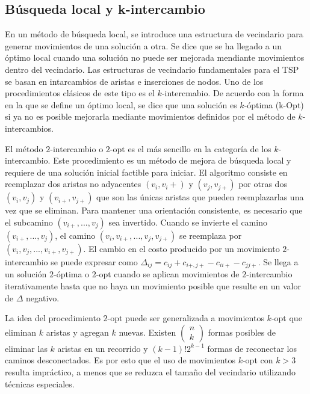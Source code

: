 \subsection*{Búsqueda local y k-intercambio}
En un método de búsqueda local, se introduce una estructura de vecindario para generar movimientos de una solución a otra. Se dice que se ha llegado a un óptimo local cuando una solución no puede ser mejorada mendiante movimientos dentro del vecindario. Las estructuras de vecindario fundamentales para el TSP se basan en intarcambios de aristas e inserciones de nodos. Uno de los procedimientos clásicos de este tipo es el $k$-intercmabio. De acuerdo con la forma en la que se define un óptimo local, se dice que una solución es $k$-óptima (k-Opt) si ya no es posible mejorarla mediante movimientos definidos por el método de $k$-intercambios.
\par El método $2$-intercambio o $2$-opt es el más sencillo en la categoría de los $k$-intercambio. Este procedimiento es un método de mejora de búsqueda local y requiere de una solución inicial factible para iniciar. El algoritmo consiste en reemplazar dos aristas no adyacentes $(v_i, v_i+)$ y $(v_j, v_{j+})$ por otras dos $(v_i, v_j)$ y $(v_{i+}, v_{j+})$  que son las únicas aristas que pueden reemplazarlas una vez que se eliminan. Para mantener una orientación consistente, es necesario que el subcamino $(v_{i+}, ..., v_j)$ sea invertido. Cuando se invierte el camino $(v_{i+}, ..., v_{j})$, el camino $(v_i, v_{i+},...,v_{j}, v_{j+})$ se reemplaza por $(v_i, v_j,..., v_{i+}, v_{j+})$. El cambio en el costo producido por un movimiento $2$-intercambio se puede expresar como $\Delta_{ij}= c_{ij}+c_{i+,j+}-c_{ii+}-c_{jj+}$. Se llega a un solución $2$-óptima o $2$-opt cuando se aplican movimientos de $2$-intercambio iterativamente hasta que no haya un movimiento posible que resulte en un valor de $\Delta$ negativo.
\par La idea del procedimiento $2$-opt puede ser generalizada a movimientos $k$-opt que eliminan $k$ aristas y agregan $k$ nuevas. Existen $\begin{pmatrix}n\\k \end{pmatrix}$ formas posibles de eliminar las $k$ aristas en un recorrido y $(k-1)!2^{k-1}$ formas de reconectar los caminos desconectados.  Es por esto que el uso de movimientos $k$-opt con $k>3$ resulta impráctico, a menos que se reduzca el tamaño del vecindario utilizando técnicas especiales.
